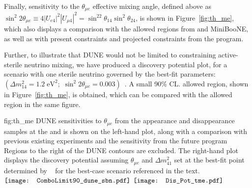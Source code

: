   
Finally, sensitivity to the $\theta_{\mu e}$ effective mixing angle, defined above as $\sin^2{2\theta_{\mu e}}\equiv 4|U_{e4}|^2|U_{\mu 4}|^2=\sin^22\theta_{14}\sin^2\theta_{24}$, is shown in Figure~\ref{fig:th_me}, which also displays a comparison with the allowed regions from  and MiniBooNE, as well as with present constraints and projected constraints from the \fnal {} program.

Further, to illustrate that DUNE would not be limited to constraining active-sterile neutrino mixing, we have produced a discovery potential plot, for a scenario with one sterile neutrino governed by the  best-fit parameters: $\left(\Delta m_{14}^2= 1.2\;\text{eV}^2;\,\,\sin^2{2\theta_{\mu e}}=0.003\right)$~\cite{LSNDSterile}. 
A small 90\% CL. allowed region, shown in Figure~\ref{fig:th_me}, is obtained, which can be compared with the  allowed region in the same figure. 
\begin{dunefigure}
{fig:th_me}
{DUNE sensitivities to $\theta_{\mu e}$ from the appearance and disappearance samples at the  and  is shown on the left-hand plot, along with a comparison with previous existing experiments and the sensitivity from the future  program Regions to the right of the DUNE contours are excluded. The right-hand plot displays the discovery potential assuming $\theta_{\mu e}$ and $\Delta m_{41}^2$ set at the best-fit point determined by ~\cite{LSNDSterile} for the best-case scenario referenced in the text.}
$\vcenter{\hbox{\texttt{[image: ComboLimit90\_dune\_sbn.pdf]}}}$
$\vcenter{\hbox{\texttt{[image: Dis\_Pot\_tme.pdf]}}}$
\end{dunefigure}


